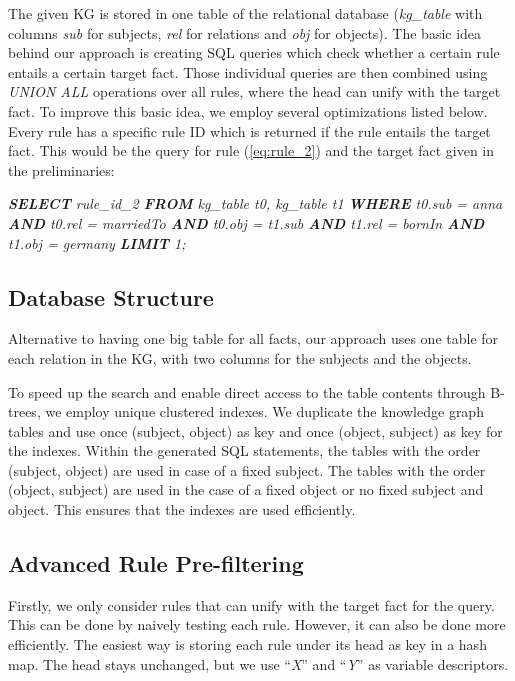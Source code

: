 \documentclass[english]{lni}
\begin{document}
The given KG is stored in one table of the relational database (\textit{kg\_table} with columns \textit{sub} for subjects, \textit{rel} for relations and \textit{obj} for objects). The basic idea behind our approach is creating SQL queries which check whether a certain rule entails a certain target fact. Those individual queries are then combined using \textit{UNION ALL} operations over all rules, where the head can unify with the target fact. To improve this basic idea, we employ several optimizations listed below. Every rule has a specific rule ID which is returned if the rule entails the target fact. This would be the query for rule (\ref{eq:rule_2}) and the target fact given in the preliminaries:

\textit{\textbf{SELECT} rule\_id\_2 \textbf{FROM} kg\_table t0,  kg\_table t1 \textbf{WHERE} t0.sub = anna \textbf{AND} t0.rel = marriedTo \textbf{AND} t0.obj = t1.sub \textbf{AND} t1.rel = bornIn \textbf{AND} t1.obj = germany \textbf{LIMIT} 1;}

\subsection{Database Structure}
\label{database-structure}
Alternative to having one big table for all facts, our approach uses one table for each relation in the KG, with two columns for the subjects and the objects. 

To speed up the search and enable direct access to the table contents through B-trees, we employ unique clustered indexes. We duplicate the knowledge graph tables and use once (subject, object) as key and once (object, subject) as key for the indexes. Within the generated SQL statements, the tables with the order (subject, object) are used in case of a fixed subject. The tables with the order (object, subject) are used in the case of a fixed object or no fixed subject and object. This ensures that the indexes are used efficiently.

\subsection{Advanced Rule Pre-filtering} 
Firstly, we only consider rules that can unify with the target fact for the query. This can be done by naively testing each rule. However, it can also be done more efficiently. The easiest way is storing each rule under its head as key in a hash map. The head stays unchanged, but we use “\textit{X}” and “\textit{Y}” as variable descriptors. 
\end{document}
